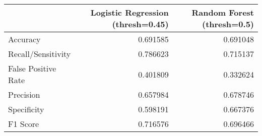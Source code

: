 \begin{tabu}{lrr}
\toprule
 & Logistic Regression (thresh=0.45) & Random Forest (thresh=0.5) \\
\midrule
Accuracy & 0.691585 & 0.691048 \\
Recall/Sensitivity & 0.786623 & 0.715137 \\
False Positive Rate & 0.401809 & 0.332624 \\
Precision & 0.657984 & 0.678746 \\
Specificity & 0.598191 & 0.667376 \\
F1 Score & 0.716576 & 0.696466 \\
\bottomrule
\end{tabu}